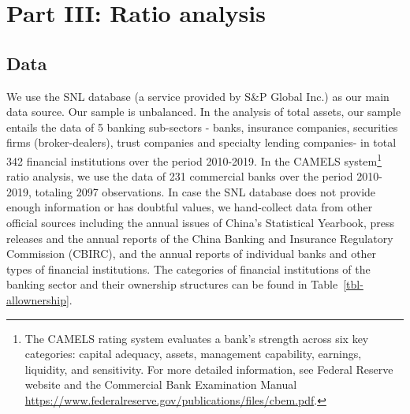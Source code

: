 \documentclass[
  12pt,
  a4paper,
  DIV=11,
  numbers=noendperiod]{scrreprt}
\begin{document}
\section{Part III: Ratio analysis}\label{part-iii-ratio-analysis}

\subsection{Data}\label{data}

We use the SNL database (a service provided by S\&P Global Inc.) as our
main data source. Our sample is unbalanced. In the analysis of total
assets, our sample entails the data of 5 banking sub-sectors - banks,
insurance companies, securities firms (broker-dealers), trust companies
and specialty lending companies- in total 342 financial institutions
over the period 2010-2019. In the CAMELS system\footnote{The CAMELS
  rating system evaluates a bank's strength across six key categories:
  capital adequacy, assets, management capability, earnings, liquidity,
  and sensitivity. For more detailed information, see Federal Reserve
  website and the Commercial Bank Examination Manual
  \url{https://www.federalreserve.gov/publications/files/cbem.pdf}.}
ratio analysis, we use the data of 231 commercial banks over the period
2010-2019, totaling 2097 observations. In case the SNL database does not
provide enough information or has doubtful values, we hand-collect data
from other official sources including the annual issues of China's
Statistical Yearbook, press releases and the annual reports of the China
Banking and Insurance Regulatory Commission (CBIRC), and the annual
reports of individual banks and other types of financial institutions.
The categories of financial institutions of the banking sector and their
ownership structures can be found in Table~\ref{tbl-allownership}.

\begingroup\fontsize{8}{10}\selectfont
\end{document}
